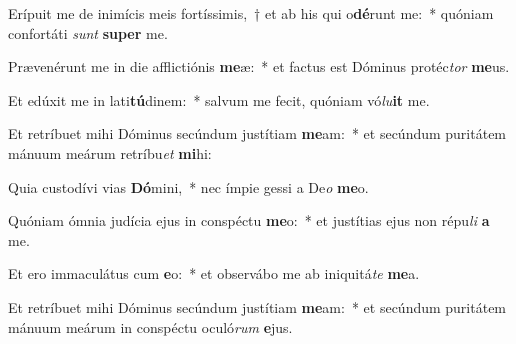 \item Erípuit me de inimícis meis fortíssimis,~† et ab his qui o\textbf{dé}runt me:~* quóniam confortáti \textit{sunt} \textbf{su}\textbf{per} me.
\item Prævenérunt me in die afflictiónis \textbf{me}æ:~* et factus est Dóminus protéc\textit{tor} \textbf{me}us.
\item Et edúxit me in lati\textbf{tú}dinem:~* salvum me fecit, quóniam vó\textit{lu}\textbf{it} me.
\item Et retríbuet mihi Dóminus secúndum justítiam \textbf{me}am:~* et secúndum puritátem mánuum meárum retríbu\textit{et} \textbf{mi}hi:
\item Quia custodívi vias \textbf{Dó}mini,~* nec ímpie gessi a De\textit{o} \textbf{me}o.
\item Quóniam ómnia judícia ejus in conspéctu \textbf{me}o:~* et justítias ejus non répu\textit{li} \textbf{a} me.
\item Et ero immaculátus cum \textbf{e}o:~* et observábo me ab iniquitá\textit{te} \textbf{me}a.
\item Et retríbuet mihi Dóminus secúndum justítiam \textbf{me}am:~* et secúndum puritátem mánuum meárum in conspéctu oculó\textit{rum} \textbf{e}jus.
